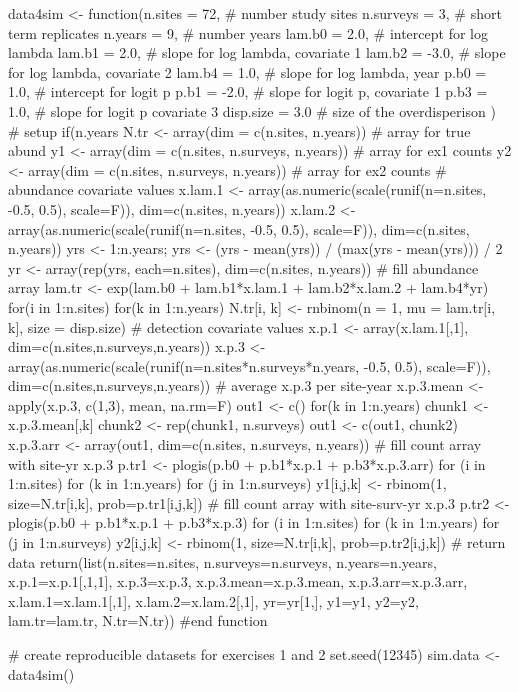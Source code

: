 \documentclass[article]{jss}
\begin{document}
\begin{Code}
data4sim <- function(n.sites = 72,   # number study sites
                     n.surveys = 3,  # short term replicates
                     n.years = 9,    # number years
                     lam.b0 = 2.0,   # intercept for log lambda
                     lam.b1 = 2.0,   # slope for log lambda, covariate 1
                     lam.b2 = -3.0,  # slope for log lambda, covariate 2
                     lam.b4 = 1.0,   # slope for log lambda, year
                     p.b0 = 1.0,     # intercept for logit p
                     p.b1 = -2.0,    # slope for logit p, covariate 1
                     p.b3 = 1.0,     # slope for logit p covariate 3
                     disp.size = 3.0 # size of the overdisperison
                     ){
  # setup
  if(n.years %
  N.tr <- array(dim = c(n.sites, n.years))           # array for true abund
  y1 <- array(dim = c(n.sites, n.surveys, n.years))  # array for ex1 counts
  y2 <- array(dim = c(n.sites, n.surveys, n.years))  # array for ex2 counts
  # abundance covariate values
  x.lam.1 <- array(as.numeric(scale(runif(n=n.sites, -0.5, 0.5), scale=F)),
                   dim=c(n.sites, n.years))
  x.lam.2 <- array(as.numeric(scale(runif(n=n.sites, -0.5, 0.5), scale=F)),
                   dim=c(n.sites, n.years))
  yrs <- 1:n.years; yrs <- (yrs - mean(yrs)) / (max(yrs - mean(yrs))) / 2
  yr <- array(rep(yrs, each=n.sites), dim=c(n.sites, n.years))
  # fill abundance array
  lam.tr <- exp(lam.b0 + lam.b1*x.lam.1 + lam.b2*x.lam.2 + lam.b4*yr)
  for(i in 1:n.sites){
    for(k in 1:n.years){
    N.tr[i, k] <- rnbinom(n = 1, mu = lam.tr[i, k], size = disp.size)
  }}
  # detection covariate values
  x.p.1 <- array(x.lam.1[,1], dim=c(n.sites,n.surveys,n.years))
  x.p.3 <- array(as.numeric(scale(runif(n=n.sites*n.surveys*n.years, -0.5, 0.5),
                                  scale=F)), dim=c(n.sites,n.surveys,n.years))
  # average x.p.3 per site-year
  x.p.3.mean <- apply(x.p.3, c(1,3), mean, na.rm=F)
  out1 <- c()
  for(k in 1:n.years){
   chunk1 <- x.p.3.mean[,k]
   chunk2 <- rep(chunk1, n.surveys)
   out1 <- c(out1, chunk2)
  }
  x.p.3.arr <- array(out1, dim=c(n.sites, n.surveys, n.years))
  # fill count array with site-yr x.p.3
  p.tr1 <- plogis(p.b0 + p.b1*x.p.1 + p.b3*x.p.3.arr)
  for (i in 1:n.sites){
    for (k in 1:n.years){
      for (j in 1:n.surveys){
        y1[i,j,k] <- rbinom(1, size=N.tr[i,k], prob=p.tr1[i,j,k])
  }}}
  # fill count array with site-surv-yr x.p.3
  p.tr2 <- plogis(p.b0 + p.b1*x.p.1 + p.b3*x.p.3)
  for (i in 1:n.sites){
    for (k in 1:n.years){
      for (j in 1:n.surveys){
        y2[i,j,k] <- rbinom(1, size=N.tr[i,k], prob=p.tr2[i,j,k])
  }}}
  # return data
  return(list(n.sites=n.sites, n.surveys=n.surveys, n.years=n.years,
              x.p.1=x.p.1[,1,1], x.p.3=x.p.3, x.p.3.mean=x.p.3.mean,
              x.p.3.arr=x.p.3.arr, x.lam.1=x.lam.1[,1],
              x.lam.2=x.lam.2[,1], yr=yr[1,], y1=y1, y2=y2,
              lam.tr=lam.tr, N.tr=N.tr))
} #end function

# create reproducible datasets for exercises 1 and 2
set.seed(12345)
sim.data <- data4sim()
\end{Code}
\end{document}
